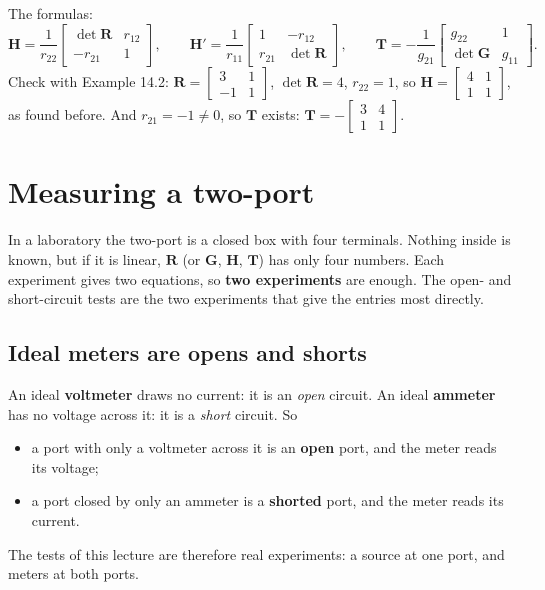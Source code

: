 \documentclass[11pt,a4paper]{article}
\newcommand{\Rm}{\mathbf{R}}  \newcommand{\Gm}{\mathbf{G}}
\newcommand{\Hm}{\mathbf{H}}  \newcommand{\Tm}{\mathbf{T}}
\begin{document}
The formulas:
\[
  \Hm = \frac{1}{r_{22}} \begin{bmatrix} \det \Rm & r_{12}\\ -r_{21} & 1 \end{bmatrix}, \qquad
  \Hm' = \frac{1}{r_{11}} \begin{bmatrix} 1 & -r_{12}\\ r_{21} & \det \Rm \end{bmatrix}, \qquad
  \Tm = -\frac{1}{g_{21}} \begin{bmatrix} g_{22} & 1\\ \det \Gm & g_{11} \end{bmatrix} .
\]
Check with Example 14.2: $\Rm = \left[\begin{smallmatrix} 3 & 1\\ -1 & 1 \end{smallmatrix}\right]$,
$\det \Rm = 4$, $r_{22} = 1$, so $\Hm = \left[\begin{smallmatrix} 4 & 1\\ 1 & 1 \end{smallmatrix}\right]$,
as found before. And $r_{21} = -1 \neq 0$, so $\Tm$ exists:
$\Tm = -\left[\begin{smallmatrix} 3 & 4\\ 1 & 1 \end{smallmatrix}\right]$.

\section{Measuring a two-port}

In a laboratory the two-port is a closed box with four terminals. Nothing inside is known, but
if it is linear, $\Rm$ (or $\Gm$, $\Hm$, $\Tm$) has only four numbers. Each experiment gives two
equations, so \textbf{two experiments} are enough. The open- and short-circuit tests are the
two experiments that give the entries most directly.

\subsection{Ideal meters are opens and shorts}

An ideal \textbf{voltmeter} draws no current: it is an \emph{open} circuit. An ideal
\textbf{ammeter} has no voltage across it: it is a \emph{short} circuit. So
\begin{itemize}
  \item a port with only a voltmeter across it is an \textbf{open} port, and the meter reads
        its voltage;
  \item a port closed by only an ammeter is a \textbf{shorted} port, and the meter reads its
        current.
\end{itemize}
The tests of this lecture are therefore real experiments: a source at one port, and meters at
both ports.
\end{document}

